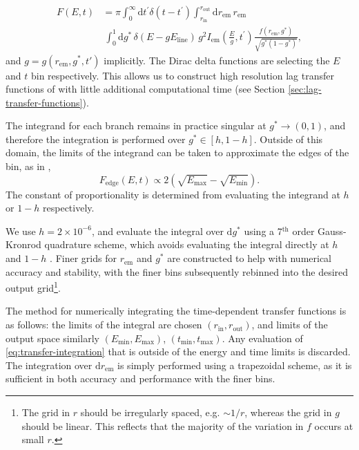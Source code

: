 \documentclass[fleqn,usenatbib]{mnras}
\renewcommand{\d}{\text{d}}
\begin{document}
\begin{align}
    \label{eq:transfer-integration}
    F(E, t) &=
    \pi
    \int_0^\infty \d t^\prime \delta(t - t^\prime)
    \int_{r_\text{in}}^{r_\text{out}} \d r_\text{em}\,r_\text{em} \nonumber \\
    &\ \int_0^1 \d g^\ast\, \delta(E - gE_\text{line})\, g^2 I_\text{em}\left(\frac{E}{g}, t^\prime\right) \frac{f(r_\text{em}, g^\ast)}{\sqrt{g^\ast (1 - g^\ast)}},
\end{align}
\noindent and $g = g( r_\text{em}, g^\ast, t')$ implicitly. The Dirac delta functions are selecting the $E$ and $t$ bin respectively. This allows us to construct high resolution lag transfer functions of \cite{reynolds_x-ray_1999} with little additional computational time (see Section \ref{sec:lag-transfer-functions}).

The integrand for each branch remains in practice singular at $g^\ast \rightarrow (0, 1)$, and therefore the integration is performed over $g^\ast \in [h, 1 - h]$. Outside of this domain, the limits of the integrand can be taken to approximate the edges of the bin, as in \cite{dauser_broad_2010},
\begin{equation}
   F_\text{edge}(E,t) \propto 2\left( \sqrt{E_\text{max}} - \sqrt{E_\text{min}} \right).
\end{equation}
The constant of proportionality is determined from evaluating the integrand at $h$ or $1 - h$ respectively.

We use $h = 2 \times 10^{-6}$, and evaluate the integral over $\d g^\ast$ using a 7$^\text{th}$ order Gauss-Kronrod quadrature scheme, which avoids evaluating the integral directly at $h$ and $1 - h$ \citep{}. Finer grids for $r_\text{em}$ and $g^\ast$ are constructed to help with numerical accuracy and stability, with the finer bins subsequently rebinned into the desired output grid\footnote{The grid in $r$ should be irregularly spaced, e.g. $\sim 1 / r$, whereas the grid in $g$ should be linear. This reflects that the majority of the variation in $f$ occurs at small $r$.}.

The method for numerically integrating the time-dependent transfer functions is as follows: the limits of the integral are chosen $(r_\text{in}, r_\text{out})$, and limits of the output space similarly $(E_\text{min}, E_\text{max})$, $(t_\text{min}, t_\text{max})$. Any evaluation of \eqref{eq:transfer-integration} that is outside of the energy and time limits is discarded.  The integration over $\d r_\text{em}$ is simply performed using a trapezoidal scheme, as it is sufficient in both accuracy and performance with the finer bins.
\end{document}
